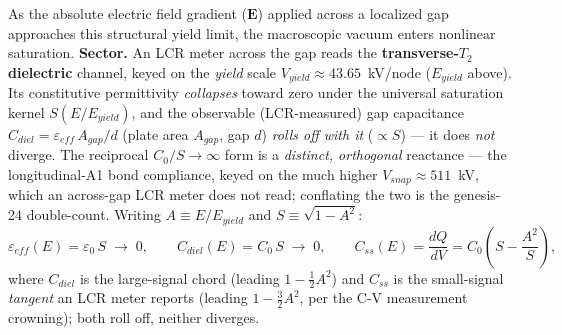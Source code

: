 As the absolute electric field gradient ($\mathbf{E}$) applied across a localized gap approaches this structural yield limit, the macroscopic vacuum enters nonlinear saturation. \textbf{Sector.} An LCR meter across the gap reads the \textbf{transverse-$T_2$ dielectric} channel, keyed on the \emph{yield} scale $V_{yield}\approx43.65$~kV/node ($E_{yield}$ above). Its constitutive permittivity \emph{collapses} toward zero under the universal saturation kernel $S(E/E_{yield})$, and the observable (LCR-measured) gap capacitance $C_{diel}=\varepsilon_{eff}\,A_{gap}/d$ (plate area $A_{gap}$, gap $d$) \emph{rolls off with it} ($\propto S$) --- it does \emph{not} diverge. The reciprocal $C_0/S\to\infty$ form is a \emph{distinct, orthogonal} reactance --- the longitudinal-A1 bond compliance, keyed on the much higher $V_{snap}\approx511$~kV, which an across-gap LCR meter does not read; conflating the two is the genesis-24 double-count. Writing $A\equiv E/E_{yield}$ and $S\equiv\sqrt{1-A^2}$:
\begin{equation}
    \varepsilon_{eff}(E) = \varepsilon_0\,S \;\to\; 0,
    \qquad
    C_{diel}(E) = C_0\,S \;\to\; 0,
    \qquad
    C_{ss}(E) = \frac{dQ}{dV} = C_0\!\left(S - \frac{A^2}{S}\right),
\end{equation}
where $C_{diel}$ is the large-signal chord (leading $1-\tfrac12 A^2$) and $C_{ss}$ is the small-signal \emph{tangent} an LCR meter reports (leading $1-\tfrac32 A^2$, per the C-V measurement crowning); both roll off, neither diverges.

